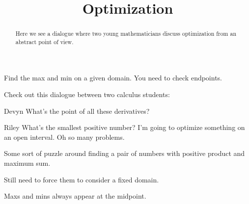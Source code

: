 \documentclass{ximera}
\title[Break-Ground:]{Optimization}
\begin{document}
\begin{abstract}
Here we see a dialogue where two young mathematicians discuss optimization from an abstract point of view.
\end{abstract}
\maketitle

Find the max and min on a given domain.  You need to check endpoints.

Check out this dialogue between two calculus students:

\begin{dialogue}
\item[Devyn] 
What's the point of all these derivatives?
\item[Riley]
What's the smallest positive number?
I'm going to optimize something on an open interval.  Oh so many problems.
\end{dialogue}

Some sort of puzzle around finding a pair of numbers with positive product and maximum sum.

Still need to force them to consider a fixed domain.

Maxs and mins always appear at the midpoint.




\end{document}
